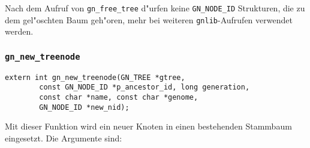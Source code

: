 \documentclass[a4paper, fleqn]{article}
\begin{document}
Nach dem Aufruf von \verb|gn_free_tree| d"urfen keine \verb|GN_NODE_ID|
Strukturen, die zu dem gel"oschten Baum geh"oren, mehr bei weiteren
\texttt{gnlib}-Aufrufen verwendet werden.


\subsubsection{\texttt{gn\_new\_treenode}}
\label{gn_new_treenode}

\begin{verbatim}
extern int gn_new_treenode(GN_TREE *gtree,
        const GN_NODE_ID *p_ancestor_id, long generation,
        const char *name, const char *genome,
        GN_NODE_ID *new_nid);
\end{verbatim}

Mit dieser Funktion wird ein neuer Knoten in einen bestehenden Stammbaum
eingesetzt. Die Argumente sind:
\end{document}
